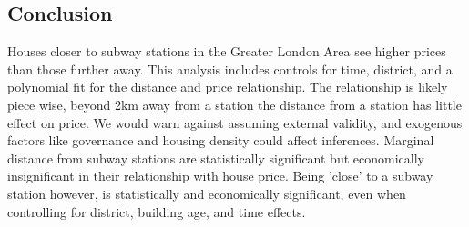 \subsection{Conclusion}
Houses closer to subway stations in the Greater London Area see higher prices than those further away. 
This analysis includes controls for time, district, and a polynomial fit for the distance and price relationship.
The relationship is likely piece wise, beyond 2km away from a station the distance from a station has little effect on price.
We would warn against assuming external validity, and exogenous factors like governance and housing density could affect inferences. 
Marginal distance from subway stations are statistically significant but economically insignificant in their relationship with house price.
Being 'close' to a subway station however, is statistically and economically significant, even when controlling for district, building age,
 and time effects.